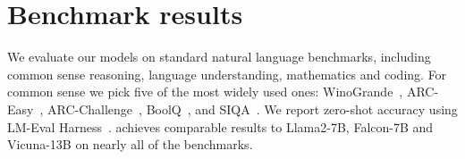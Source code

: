 \section{Benchmark results}
We evaluate our models on standard natural language benchmarks, including common sense reasoning, language understanding, mathematics and coding. For common sense we pick five of the most widely used ones: WinoGrande~\cite{sakaguchi2019winogrande}, ARC-Easy~\cite{pirtoaca2019answering}, ARC-Challenge~\cite{ferre2021first}, BoolQ~\cite{clark2019boolq}, and SIQA~\cite{bauer2021identify}. We report zero-shot accuracy using LM-Eval Harness~\cite{eval-harness}. {\phionepointfive } achieves comparable results to Llama2-7B, Falcon-7B and Vicuna-13B on nearly all of the benchmarks. 
\begin{table}[h!]
\centering
\small
\label{tab:my_table}
\caption{{Common Sense Reasoning Benchmarks.}}
\end{table}

